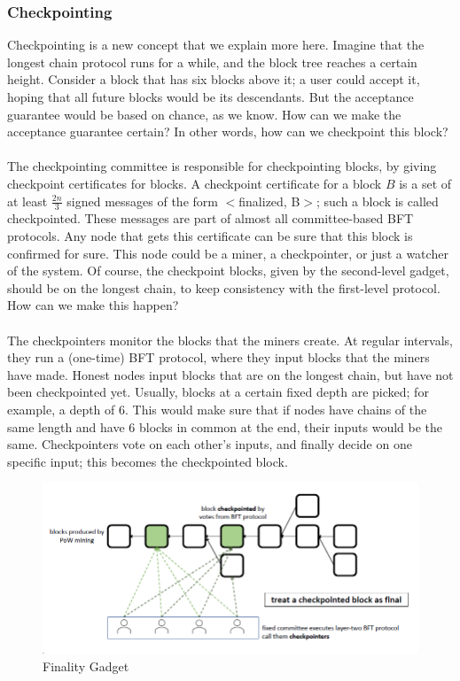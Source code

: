 	\subsubsection{Checkpointing}
	Checkpointing is a new concept that we explain more here. Imagine that the longest chain protocol runs for a while, and the block tree reaches a certain height. Consider a block that has six blocks above it; a user could accept it, hoping that all future blocks would be its descendants. But the acceptance guarantee would be based on chance, as we know. How can we make the acceptance guarantee certain? In other words, how can we checkpoint this block?\\\\
	The checkpointing committee is responsible for checkpointing blocks, by giving checkpoint certificates for blocks. A checkpoint certificate for a block $B$ is a set of at least $\frac{2n}{3}$ signed messages of the form $<$finalized, B$>$; such a block is called checkpointed. These messages are part of almost all committee-based BFT protocols. Any node that gets this certificate can be sure that this block is confirmed for sure. This node could be a miner, a checkpointer, or just a watcher of the system. Of course, the checkpoint blocks, given by the second-level gadget, should be on the longest chain, to keep consistency with the first-level protocol. How can we make this happen?\\\\
	The checkpointers monitor the blocks that the miners create. At regular intervals, they run a (one-time) BFT protocol, where they input blocks that the miners have made. Honest nodes input blocks that are on the longest chain, but have not been checkpointed yet. Usually, blocks at a certain fixed depth are picked; for example, a depth of 6. This would make sure that if nodes have chains of the same length and have 6 blocks in common at the end, their inputs would be the same. Checkpointers vote on each other’s inputs, and finally decide on one specific input; this becomes the checkpointed block.
	\begin{figure}[h!]
		\centering
		\includegraphics[width=0.6\linewidth]{Fig/17/F6}
		\caption{Finality Gadget}
		\label{fig:L17_f6}
	\end{figure}
	
